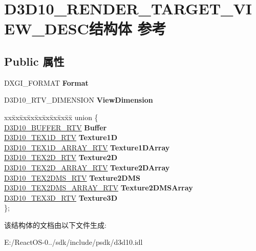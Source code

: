 \hypertarget{struct_d3_d10___r_e_n_d_e_r___t_a_r_g_e_t___v_i_e_w___d_e_s_c}{}\section{D3\+D10\+\_\+\+R\+E\+N\+D\+E\+R\+\_\+\+T\+A\+R\+G\+E\+T\+\_\+\+V\+I\+E\+W\+\_\+\+D\+E\+S\+C结构体 参考}
\label{struct_d3_d10___r_e_n_d_e_r___t_a_r_g_e_t___v_i_e_w___d_e_s_c}
\subsection*{Public 属性}
\begin{DoxyCompactItemize}
\item 
\mbox{\label{struct_d3_d10___r_e_n_d_e_r___t_a_r_g_e_t___v_i_e_w___d_e_s_c_a766d1c000666aecb8d7eb247bfbbab9f}} 
D\+X\+G\+I\+\_\+\+F\+O\+R\+M\+AT {\bfseries Format}
\item 
\mbox{\label{struct_d3_d10___r_e_n_d_e_r___t_a_r_g_e_t___v_i_e_w___d_e_s_c_add75aaf95b1578698c9a6a6ce493d6cb}} 
D3\+D10\+\_\+\+R\+T\+V\+\_\+\+D\+I\+M\+E\+N\+S\+I\+ON {\bfseries View\+Dimension}
\item 
\mbox{\label{struct_d3_d10___r_e_n_d_e_r___t_a_r_g_e_t___v_i_e_w___d_e_s_c_a08c90885bc4c90921c5eeaa5149c0d23}} 
\begin{tabbing}
xx\=xx\=xx\=xx\=xx\=xx\=xx\=xx\=xx\=\kill
union \{\\
\>\hyperlink{struct_d3_d10___b_u_f_f_e_r___r_t_v}{D3D10\_BUFFER\_RTV} {\bfseries Buffer}\\
\>\hyperlink{struct_d3_d10___t_e_x1_d___r_t_v}{D3D10\_TEX1D\_RTV} {\bfseries Texture1D}\\
\>\hyperlink{struct_d3_d10___t_e_x1_d___a_r_r_a_y___r_t_v}{D3D10\_TEX1D\_ARRAY\_RTV} {\bfseries Texture1DArray}\\
\>\hyperlink{struct_d3_d10___t_e_x2_d___r_t_v}{D3D10\_TEX2D\_RTV} {\bfseries Texture2D}\\
\>\hyperlink{struct_d3_d10___t_e_x2_d___a_r_r_a_y___r_t_v}{D3D10\_TEX2D\_ARRAY\_RTV} {\bfseries Texture2DArray}\\
\>\hyperlink{struct_d3_d10___t_e_x2_d_m_s___r_t_v}{D3D10\_TEX2DMS\_RTV} {\bfseries Texture2DMS}\\
\>\hyperlink{struct_d3_d10___t_e_x2_d_m_s___a_r_r_a_y___r_t_v}{D3D10\_TEX2DMS\_ARRAY\_RTV} {\bfseries Texture2DMSArray}\\
\>\hyperlink{struct_d3_d10___t_e_x3_d___r_t_v}{D3D10\_TEX3D\_RTV} {\bfseries Texture3D}\\
\}; \\

\end{tabbing}\end{DoxyCompactItemize}


该结构体的文档由以下文件生成\+:\begin{DoxyCompactItemize}
\item 
E\+:/\+React\+O\+S-\/0../sdk/include/psdk/d3d10.\+idl\end{DoxyCompactItemize}
